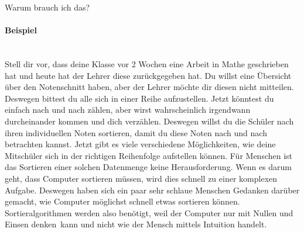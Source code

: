 \documentclass[a4paper, 12pt]{report}
\begin{document}
	\thispagestyle{empty}
	
	{
		\centering
		\Huge
		\color{blue}
		Warum brauch ich das?
	}
	
	\raggedright
	\paragraph{\color{blue}Beispiel} \mbox{} \\
	
	Stell dir vor, dass deine Klasse vor 2 Wochen eine Arbeit in Mathe geschrieben hat
	und heute hat der Lehrer diese zurückgegeben hat.
	Du willst eine Übersicht über den Notenschnitt haben, aber der Lehrer möchte dir diesen nicht mitteilen.
	Deswegen bittest du alle sich in einer Reihe aufzustellen.
	Jetzt könntest du einfach nach und nach zählen, aber wirst wahrscheinlich irgendwann durcheinander kommen und dich verzählen.
	Deswegen willst du die Schüler nach ihren individuellen Noten sortieren, damit du diese Noten nach und nach betrachten kannst.
	Jetzt gibt es viele verschiedene Möglichkeiten, wie deine Mitschüler sich in der richtigen Reihenfolge aufstellen können.
	Für Menschen ist das Sortieren einer solchen Datenmenge keine Herausforderung.
	Wenn es darum geht, dass Computer sortieren müssen, wird dies schnell zu einer komplexen Aufgabe.
	Deswegen haben sich ein paar sehr schlaue Menschen Gedanken darüber gemacht, wie Computer möglichst schnell etwas sortieren können.
	\\
	Sortieralgorithmen werden also benötigt, weil der Computer nur mit Nullen und Einsen \dq denken\dq\ kann und nicht wie der Mensch mittels Intuition handelt.
\end{document}
